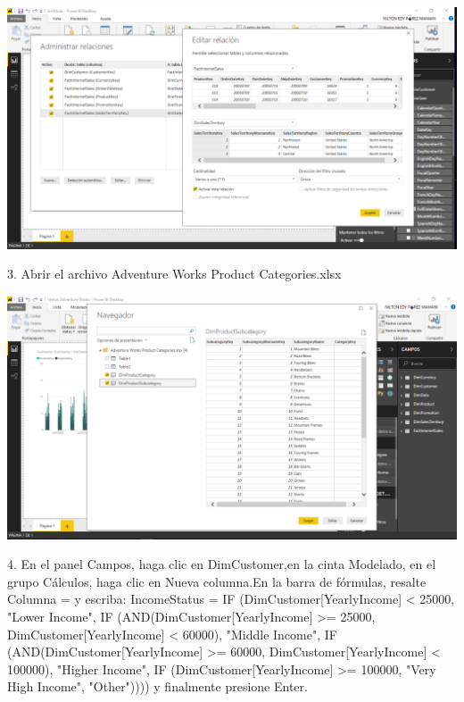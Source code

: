 \begin{center}
\includegraphics[width=15cm]{./Imagenes/img2} 
\end{center}

\begin{itemize}
3. Abrir el archivo Adventure Works Product Categories.xlsx
\end{itemize} 

\begin{center}
\includegraphics[width=15cm]{./Imagenes/img4} 
\end{center}


\newpage
\begin{itemize}
4. En el panel Campos, haga clic en DimCustomer,en la cinta Modelado, en el grupo Cálculos, haga clic en Nueva columna.En la barra de fórmulas, resalte Columna = y escriba:
IncomeStatus = IF (DimCustomer[YearlyIncome] < 25000, "Lower Income",
IF (AND(DimCustomer[YearlyIncome] >= 25000, DimCustomer[YearlyIncome] < 60000),
"Middle Income",
IF (AND(DimCustomer[YearlyIncome] >= 60000, DimCustomer[YearlyIncome] < 100000),
"Higher Income",
IF (DimCustomer[YearlyIncome] >= 100000, "Very High Income", "Other")))) y finalmente presione Enter.
\end{itemize}

